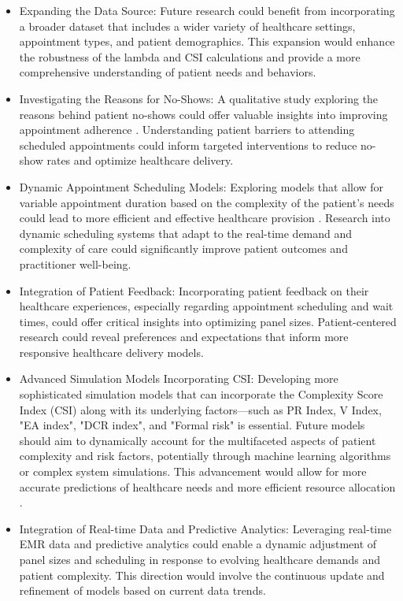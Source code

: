 \documentclass[11pt]{article}
\theoremstyle{definition}
\begin{document}
\begin{itemize}
\item Expanding the Data Source: Future research could benefit from incorporating a broader dataset that includes a wider variety of healthcare settings, appointment types, and patient demographics. This expansion would enhance the robustness of the lambda and CSI calculations and provide a more comprehensive understanding of patient needs and behaviors.

\item Investigating the Reasons for No-Shows: A qualitative study exploring the reasons behind patient no-shows could offer valuable insights into improving appointment adherence \cite{Liu2014}. Understanding patient barriers to attending scheduled appointments could inform targeted interventions to reduce no-show rates and optimize healthcare delivery.

\item Dynamic Appointment Scheduling Models: Exploring models that allow for variable appointment duration based on the complexity of the patient's needs could lead to more efficient and effective healthcare provision \cite{Abdalkareem2021, Luo2017}. Research into dynamic scheduling systems that adapt to the real-time demand and complexity of care could significantly improve patient outcomes and practitioner well-being.

\item Integration of Patient Feedback: Incorporating patient feedback on their healthcare experiences, especially regarding appointment scheduling and wait times, could offer critical insights into optimizing panel sizes. Patient-centered research could reveal preferences and expectations that inform more responsive healthcare delivery models. \cite{Angstman2016}

\item Advanced Simulation Models Incorporating CSI: Developing more sophisticated simulation models that can incorporate the Complexity Score Index (CSI) along with its underlying factors—such as PR Index, V Index, "EA index", "DCR index", and "Formal risk" is essential. Future models should aim to dynamically account for the multifaceted aspects of patient complexity and risk factors, potentially through machine learning algorithms or complex system simulations. This advancement would allow for more accurate predictions of healthcare needs and more efficient resource allocation \cite{humphreys2022}.

\item Integration of Real-time Data and Predictive Analytics: Leveraging real-time EMR data and predictive analytics could enable a dynamic adjustment of panel sizes and scheduling in response to evolving healthcare demands and patient complexity. This direction would involve the continuous update and refinement of models based on current data trends.


\end{itemize}
\end{document}
